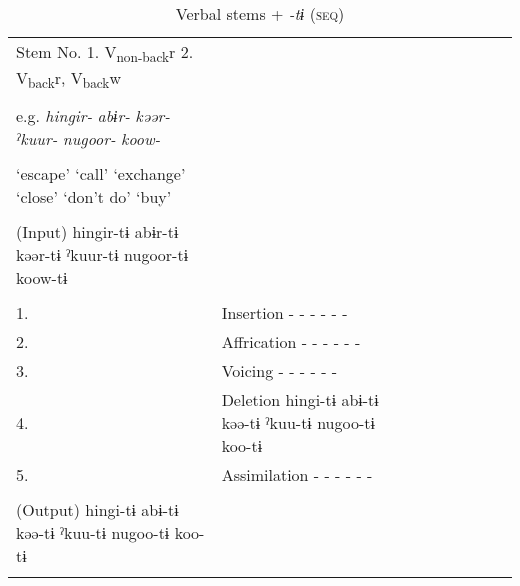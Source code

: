 \begin{table}
\caption{\label{tab:key:61} Verbal stems + \textit{-tɨ}  (\textsc{seq})}
\begin{tabularx}{\textwidth}{XX lll lll}
\lsptoprule
Stem No.  1. V\textsubscript{non-back}r  2. V\textsubscript{back}r, V\textsubscript{back}w                                     \\
                                                                                                                               \\
  e.g.  \textit{hingir-}  \textit{abɨr-}  \textit{kəər-}  \textit{ˀkuur-}  \textit{nugoor-}  \textit{koow-}\\                  \\
‘escape’  ‘call’  ‘exchange’  ‘close’  ‘don’t do’  ‘buy’                                                                  \\
                                                                                                                               \\
  (Input)  hingir-tɨ  abɨr-tɨ  kəər-tɨ  ˀkuur-tɨ  nugoor-tɨ  koow-tɨ                                                           \\
\midrule                                                                                                                       \\
1. & Insertion  -  -  -  -  -  -                                                                                               \\
2. & Affrication  -  -  -  -  -  -                                                                                             \\
3. & Voicing  -  -  -  -  -  -                                                                                                 \\
4. & Deletion  hingi-tɨ  abɨ-tɨ  kəə-tɨ  ˀkuu-tɨ  nugoo-tɨ  koo-tɨ                                                             \\
5. & Assimilation  -  -  -  -  -  -                                                                                            \\
\midrule                                                                                                                       \\
  (Output)  hingi-tɨ  abɨ-tɨ  kəə-tɨ  ˀkuu-tɨ  nugoo-tɨ  koo-tɨ\\                                                              \\

\end{tabularx}
\end{table}
